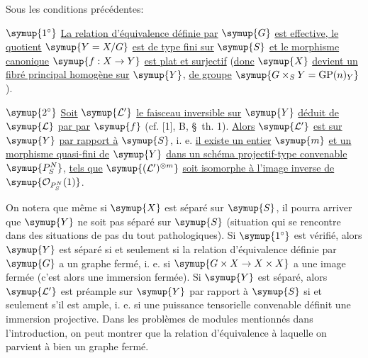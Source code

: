  Sous les conditions précédentes:

\smallskip
\noindent $\symup{1^\circ}$ \uline{La relation d'équivalence définie par} $\symup{G}$ \uline{est
effective, le quotient} $\symup{Y=X/G}$ \uline{est de type fini sur} $\symup{S}$ \uline{et le morphisme
canonique} $\symup{f:X\to Y}$ \uline{est plat et surjectif} (\uline{donc} $\symup{X}$ \uline{devient un fibré
principal homogène sur} $\symup{Y}$, \uline{de groupe} $\symup{G\times_S Y=\operatorname{GP}(n)_Y}$).

\smallskip
\noindent $\symup{2^\circ}$ \uline{Soit} $\symup{\mathcal L'}$ \uline{le faisceau inversible sur} $\symup{Y}$ \uline{déduit de} $\symup{\mathcal L}$ \uline{par  par} $\symup{f}$ (cf. [1], B, \S~th. 1). \uline{Alors} $\symup{\mathcal L'}$ \uline{est  sur} $\symup{Y}$ \uline{par rapport à} $\symup{S}$,
i. e. \uline{il existe un entier} $\symup{m}$ \uline{et un morphisme quasi-fini de} $\symup{Y}$ \uline{dans un schéma projectif-type convenable} $\symup{P_S^N}$, \uline{tels que} $\symup{(\mathcal L')^{\otimes m}}$ \uline{soit isomorphe à l'image inverse de} $\symup{\mathcal O_{P_S^N}(1)}$.

On notera que même si $\symup{X}$ est séparé sur $\symup{S}$, il pourra arriver que $\symup{Y}$ ne soit
pas séparé sur $\symup{S}$ (situation qui se rencontre dans des situations de
 pas du tout pathologiques). Si $\symup{1^\circ}$ est vérifié,
alors $\symup{Y}$ est séparé si et seulement si la relation d'équivalence définie par
$\symup{G}$ a un graphe fermé, i. e. si $\symup{G\times X\to X\times X}$ a une image fermée
(c'est alors une immersion fermée). Si $\symup{Y}$ est séparé, alors $\symup{\mathcal L'}$ est
préample sur $\symup{Y}$ par rapport à $\symup{S}$ si et seulement s'il est ample, i. e. si
une puissance tensorielle convenable définit une immersion projective. Dans
les problèmes de modules mentionnés dans l'introduction, on peut montrer que la
relation d'équivalence à laquelle on parvient à bien un graphe fermé.

